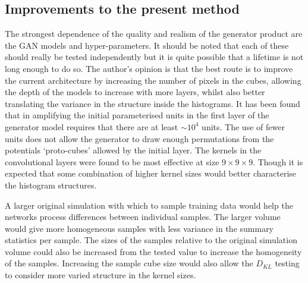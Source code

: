 \documentclass[twocolumn]{article}
\numberwithin{equation}{section}
\begin{document}

\subsection{Improvements to the present method}
The strongest dependence of the quality and realism of the generator product are the GAN models and hyper-parameters. It 
should be noted that each of these should really be tested independently but it is quite possible that a lifetime is not 
long enough to do so. The author's opinion is that the best route is to improve the current architecture by increasing the 
number of pixels in the cubes, allowing the depth of the models to increase with more layers, whilst also better translating
the variance in the structure inside the histograms. It has been found that in amplifying the initial parameterised units 
in the first layer of the generator model requires that there are at least $\sim \! 10^4$ units. The use of
fewer units does not allow the generator to draw enough permutations from the potentials  `proto-cubes' allowed by the 
initial layer. The kernels in the convolutional layers were found to be most effective at size $9 \times 9 \times 9$. 
Though it is expected that some combination of higher kernel sizes would better characterise the histogram structures. 

A larger original simulation with which to sample training data would help the networks process differences between 
individual samples. The larger volume would give more homogeneous samples with less variance in the summary statistics 
per sample. 
The sizes of the samples relative to the original simulation volume could also be increased from the tested value to
increase the homogeneity of the samples. Increasing the sample cube size would also allow the $D_{KL}$ testing to consider
more varied structure in the kernel sizes. 

\end{document}
